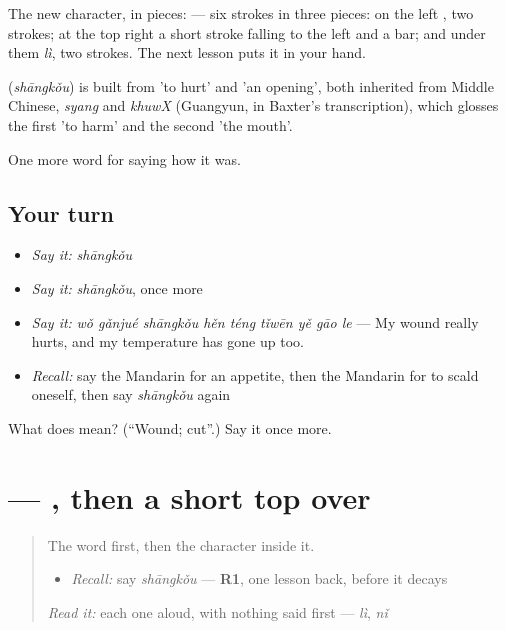 The new character, in pieces:  — six strokes in three pieces: on the left , two strokes; at the top right a short stroke falling to the left and a bar; and under them  \emph{lì}, two strokes. The next lesson puts it in your hand.

\begin{cousinweb}
\textbf{} (\emph{shāngkǒu}) is built from  'to hurt' and  'an opening', both inherited from Middle Chinese, \emph{syang} and \emph{khuwX} (Guangyun, in Baxter's transcription), which glosses the first 'to harm' and the second 'the mouth'.
\end{cousinweb}

\begin{grammarlens}[title={What you've built}]
One more word for saying how it was.
\end{grammarlens}

\subsection*{Your turn}
\begin{itemize}
\raggedright
  \item \emph{Say it:} \emph{shāngkǒu}
  \item \emph{Say it:} \emph{shāngkǒu}, once more
  \item \emph{Say it:} \emph{wǒ gǎnjué shāngkǒu hěn téng tǐwēn yě gāo le} — My wound really hurts, and my temperature has gone up too.
  \item \emph{Recall:} say the Mandarin for an appetite, then the Mandarin for to scald oneself, then say \emph{shāngkǒu} again
\end{itemize}

\begin{tcolorbox}[breakable,colback=teal!4,colframe=teal!35!black,title={Before you move on}]
What does  mean? (\textquotedblleft{}Wound; cut\textquotedblright{}.) Say it once more.
\end{tcolorbox}
\section[\texorpdfstring{\zh{伤} (shāng)}{伤 (shāng)}]{ — , then a short top over }

\label{lesson:ZH-W478-shang-hurt}



\begin{quote}
The word first, then the character inside it.

\begin{itemize}
\raggedright
  \item \emph{Recall:} say \emph{shāngkǒu} — \textbf{R1}, one lesson back, before it decays
\end{itemize}

\begin{quote}
 
\end{quote}

\emph{Read it:} each one aloud, with nothing said first — \emph{lì}, \emph{nǐ}
\end{quote}

